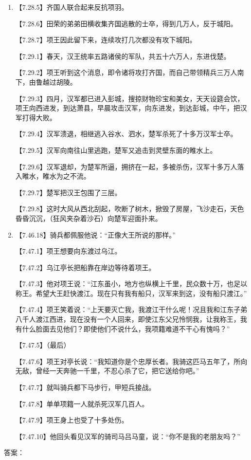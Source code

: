 \documentclass[fontset=none,11pt,a4paper]{ctexart}
\newcommand{\answerline}[1]{\underline{\hspace{#1}}}
\begin{document}
\begin{enumerate}[label=\Alph*.]
\noindent 【7.44.6】张子房回答说：“楚军即将崩溃，韩信、彭越没有分到一块封地，他们不来会合是很自然的。君王能和他们共分天下，眼下可以使他们立刻前来。如果不能这样，局势的发展很难预料。君王能从陈县以东到海边的地区，全部划给韩信，睢阳以北到谷城，分给彭越，使他们各自为战，那么楚军是容易打败的。”\par
  \item
\noindent 【7.28.5】齐国人联合起来反抗项羽。\par
\noindent 【7.28.6】田荣的弟弟田横收集齐国逃散的士卒，得到几万人，反于城阳。\par
\noindent 【7.28.7】项王因此留下来，连续攻打几次都没有攻下城阳。\par
\noindent 【7.29.1】春天，汉王统率五路诸侯的军队，共五十六万人，东进伐楚。\par
\noindent 【7.29.2】项王听到这个消息，即令诸将攻打齐国，而自己带领精兵三万人南下，由鲁越过胡陵。\par
\noindent 【7.29.3】四月，汉军都已进入彭城，搜掠财物珍宝和美女，天天设筵会饮，项王向西进发，到达萧县，早晨攻击汉军，向东进发，到达彭城，中午，把汉军打得大败。\par
\noindent 【7.29.4】汉军溃退，相继逃入谷水、泗水，楚军杀死了十多万汉军士卒。\par
\noindent 【7.29.5】汉军向南往山里逃跑，楚军又追击到灵壁东面的睢水上。\par
\noindent 【7.29.6】汉军退却，为楚军所逼，拥挤在一起，多被杀伤，汉军十多万人落入睢水，睢水为之不流。\par
\noindent 【7.29.7】楚军把汉王包围了三层。\par
\noindent 【7.29.8】这时大风从西北刮起，吹断了树木，掀毁了房屋，飞沙走石，天色昏昏沉沉，（狂风夹杂着沙石）向楚军迎面扑来。\par
  \item
\noindent 【7.46.18】骑兵都佩服他说：“正像大王所说的那样。”\par
\noindent 【7.47.1】项王想要向东渡过乌江。\par
\noindent 【7.47.2】乌江亭长把船靠在岸边等待着项王。\par
\noindent 【7.47.3】他对项王说：“江东虽小，地方也纵横上千里，民众数十万，也足以称王。希望大王赶快渡江。现在只有我有船只，汉军来到这，没有船只渡江。”\par
\noindent 【7.47.4】项王笑着说：“上天要灭亡我，我渡江干什么呢！况且我和江东子弟八千人渡江西进，现在没有一个人回来，即使江东父兄怜悯我，让我称王，我有什么脸面去见他们？即使他们不说什么，我项籍难道不干心有愧吗？”\par
\noindent 【7.47.5】（最后）\par
\noindent 【7.47.6】项王对亭长说：“我知道你是个忠厚长者。我骑这匹马五年了，所向无敌，曾经一天奔驰一千里，不忍心杀了它，把它送给你吧。”\par
\noindent 【7.47.7】就叫骑兵都下马步行，甲短兵接战。\par
\noindent 【7.47.8】单单项籍一人就杀死汉军几百人。\par
\noindent 【7.47.9】项王身上也受了十多处伤。\par
\noindent 【7.47.10】他回头看见汉军的骑司马吕马童，说：“你不是我的老朋友吗？”\par
\end{enumerate}
答案：\answerline{2.2cm}
\end{document}
